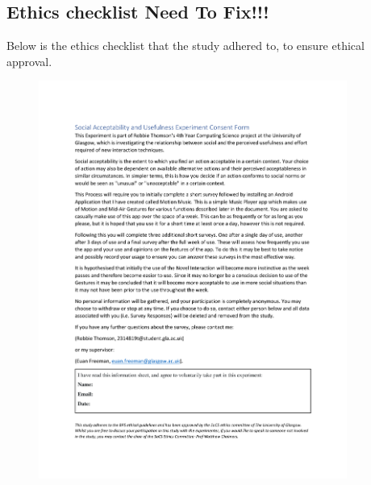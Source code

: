\documentclass{l4proj}
\begin{document}
\begin{appendices}

\chapter{Ethics checklist Need To Fix!!!}
Below is the ethics checklist that the study adhered to, to ensure ethical approval.
\begin{figure}[!htb]
    \centering
    \includegraphics[width=0.9\textwidth]{images/SocialAcceptabilityConsentForm.pdf}
\end{figure}


\end{appendices}
\end{document}
